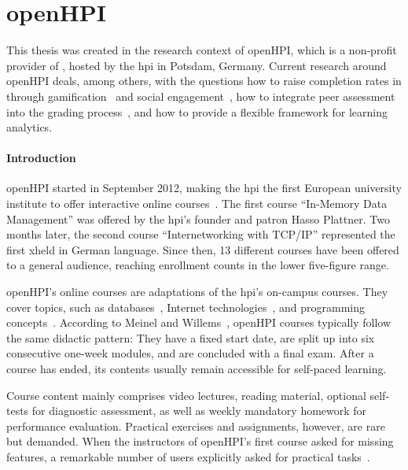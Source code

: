 \section{openHPI}\label{section:openhpi}

This thesis was created in the research context of openHPI, which is a non-profit provider of \moocs, hosted by the \gls{hpi} in Potsdam, Germany. Current research around openHPI deals, among others, with the questions how to raise completion rates in \moocs through gamification~\cite{willems2014motivating} and social engagement~\cite{fricke2014raising}, how to integrate peer assessment into the grading process~\cite{petrick2014designing}, and how to provide a flexible framework for learning analytics.

\paragraph{Introduction}

openHPI started in September 2012, making the \gls{hpi} the first European university institute to offer interactive online courses~\cite{willems2014reflections}. The first course ``In-Memory Data Management'' was offered by the \gls{hpi}'s founder and patron Hasso Plattner. Two months later, the second course ``Internetworking with TCP/IP'' represented the first x\mooc held in German language. Since then, 13 different courses have been offered to a general audience, reaching enrollment counts in the lower five-figure range.

openHPI's online courses are adaptations of the \gls{hpi}'s on-campus courses. They cover \cs topics, such as databases~\cite{naumann2014ein,plattner2013course}, Internet technologies~\cite{willems2014reflections}, and programming concepts~\cite{loewis2014scaling,mueller2014security}. According to Meinel and Willems~\cite{meinel80openhpi}, openHPI courses typically follow the same didactic pattern: They have a fixed start date, are split up into six consecutive one-week modules, and are concluded with a final exam. After a course has ended, its contents usually remain accessible for self-paced learning.

Course content mainly comprises video lectures, reading material, optional self-tests for diagnostic assessment, as well as weekly mandatory homework for performance evaluation. Practical exercises and assignments, however, are rare but demanded. When the instructors of openHPI's first course asked for missing features, a remarkable number of users explicitly asked for practical tasks~\cite{willems2013introducing}.

